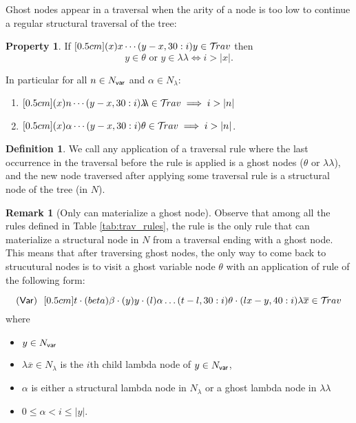 \documentclass{article}
\theoremstyle{definition}
\newtheorem{definition}{Definition}[section]
\newtheorem{property}{Property}[section]
\newtheorem{remark}{Remark}[section]
\newcommand\Nodes{N}%
\newcommand\NodesVar{N_{\sf var}}%
\newcommand\NodesLmd{N_\lambda}%
\newcommand{\ghostlmd}{{\lambda\!\!\lambda}}
\newcommand{\ghostvar}{\theta}
\begin{document}
Ghost nodes appear in a traversal when the arity of a node is too low to continue a regular
structural traversal of the tree:
\begin{property}
If $\Pstr[0.5cm]{(x){x} \cdots (y-x,30:i){y}} \in \travset$ then
$$ y \in \ghostvar \mbox{ or } y \in\ghostlmd \iff i > |x|.$$

In particular for all $n\in\NodesVar$ and $\alpha\in\NodesLmd$:
\begin{enumerate}
\item $\Pstr[0.5cm]{(x){n} \cdots (y-x,30:i){\ghostlmd}} \in \travset \implies i > |n|$
\item $\Pstr[0.5cm]{(x){\alpha} \cdots (y-x,30:i){\ghostvar}} \in \travset \implies i > |n|$.
\end{enumerate}
\end{property}

\begin{definition}
We call  any application of a traversal rule  where the last occurrence in the traversal before the rule is applied is a ghost nodes ($\ghostvar$ or $\ghostlmd$), and the new node traversed after applying some traversal rule is a structural node of the tree (in $\Nodes$).
\end{definition}

\begin{remark}[Only  can materialize a ghost node]
Observe that among all the rules defined in Table \ref{tab:trav_rules}, the rule  is the only rule that can materialize a structural node in $\Nodes$ from a traversal ending with a ghost node. This means that after traversing ghost nodes, the only way to come back to strucutural nodes is to visit a ghost variable node $\ghostvar$ with an application of rule  of the following form:

$$\rulename{Var}\ \  \Pstr[0.5cm]{ t \cdot(beta){\beta} \cdot
(y){y} \cdot (l){\alpha}  \ldots (t-l,30:i){\ghostvar}
    \cdot (lx-y,40:i){\lambda \overline{x}}
     \in\travset}$$
where
\begin{itemize}
\item $y \in \NodesVar$
\item $\lambda \overline{x} \in \NodesLmd$ is the $i$th child lambda node of $y \in \NodesVar$,
\item $\alpha$ is either a structural lambda node in $\Nodes_\lambda$ or a ghost lambda node in $\ghostlmd$
\item $0\leq \alpha < i \leq |y|$.
\end{itemize}
\end{remark}
\end{document}
